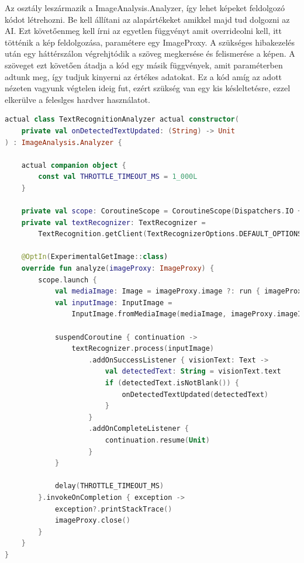 Az osztály leszármazik a ImageAnalysis.Analyzer, így lehet képeket feldolgozó kódot létrehozni.
Be kell állítani az alapártékeket amikkel majd tud dolgozni az AI.
Ezt követőenmeg kell írni az egyetlen függvényt amit overrideolni kell, itt tötténik a kép feldolgozása, paramétere egy ImageProxy.
A szükséges hibakezelés után egy háttérszálon végrehjtódik a szöveg megkersése és felismerése a képen.
A szöveget ezt követően átadja a kód egy másik függvények, amit paraméterben adtunk meg, így tudjuk kinyerni az értékes adatokat.
Ez a kód amíg az adott nézeten vagyunk végtelen ideig fut, ezért szükség van egy kis késleltetésre, ezzel elkerülve a feleslges hardver használatot.

\begin{lstlisting}[caption={Szövegfelismerés.}, label={lst:TextRec}, language=Kotlin]
actual class TextRecognitionAnalyzer actual constructor(
    private val onDetectedTextUpdated: (String) -> Unit
) : ImageAnalysis.Analyzer {

    actual companion object {
        const val THROTTLE_TIMEOUT_MS = 1_000L
    }

    private val scope: CoroutineScope = CoroutineScope(Dispatchers.IO + SupervisorJob())
    private val textRecognizer: TextRecognizer =
        TextRecognition.getClient(TextRecognizerOptions.DEFAULT_OPTIONS)

    @OptIn(ExperimentalGetImage::class)
    override fun analyze(imageProxy: ImageProxy) {
        scope.launch {
            val mediaImage: Image = imageProxy.image ?: run { imageProxy.close(); return@launch }
            val inputImage: InputImage =
                InputImage.fromMediaImage(mediaImage, imageProxy.imageInfo.rotationDegrees)

            suspendCoroutine { continuation ->
                textRecognizer.process(inputImage)
                    .addOnSuccessListener { visionText: Text ->
                        val detectedText: String = visionText.text
                        if (detectedText.isNotBlank()) {
                            onDetectedTextUpdated(detectedText)
                        }
                    }
                    .addOnCompleteListener {
                        continuation.resume(Unit)
                    }
            }

            delay(THROTTLE_TIMEOUT_MS)
        }.invokeOnCompletion { exception ->
            exception?.printStackTrace()
            imageProxy.close()
        }
    }
}
\end{lstlisting}